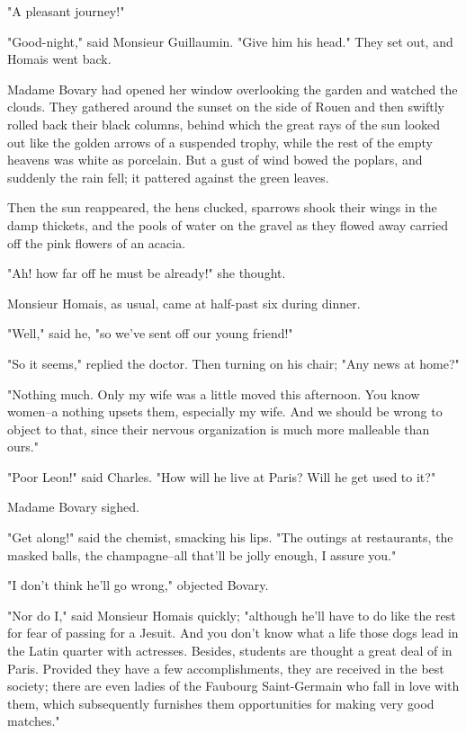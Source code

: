 \documentclass{tufte-book}
\begin{document}
"A pleasant journey!"

"Good-night," said Monsieur Guillaumin. "Give him his head." They set
out, and Homais went back.

Madame Bovary had opened her window overlooking the garden and watched
the clouds. They gathered around the sunset on the side of Rouen and
then swiftly rolled back their black columns, behind which the great
rays of the sun looked out like the golden arrows of a suspended trophy,
while the rest of the empty heavens was white as porcelain. But a gust
of wind bowed the poplars, and suddenly the rain fell; it pattered
against the green leaves.

Then the sun reappeared, the hens clucked, sparrows shook their wings in
the damp thickets, and the pools of water on the gravel as they flowed
away carried off the pink flowers of an acacia.

"Ah! how far off he must be already!" she thought.

Monsieur Homais, as usual, came at half-past six during dinner.

"Well," said he, "so we've sent off our young friend!"

"So it seems," replied the doctor. Then turning on his chair; "Any news
at home?"

"Nothing much. Only my wife was a little moved this afternoon. You know
women--a nothing upsets them, especially my wife. And we should be
wrong to object to that, since their nervous organization is much more
malleable than ours."

"Poor Leon!" said Charles. "How will he live at Paris? Will he get used
to it?"

Madame Bovary sighed.

"Get along!" said the chemist, smacking his lips. "The outings at
restaurants, the masked balls, the champagne--all that'll be jolly
enough, I assure you."

"I don't think he'll go wrong," objected Bovary.

"Nor do I," said Monsieur Homais quickly; "although he'll have to do
like the rest for fear of passing for a Jesuit. And you don't know what
a life those dogs lead in the Latin quarter with actresses. Besides,
students are thought a great deal of in Paris. Provided they have a few
accomplishments, they are received in the best society; there are even
ladies of the Faubourg Saint-Germain who fall in love with them, which
subsequently furnishes them opportunities for making very good matches."
\end{document}
